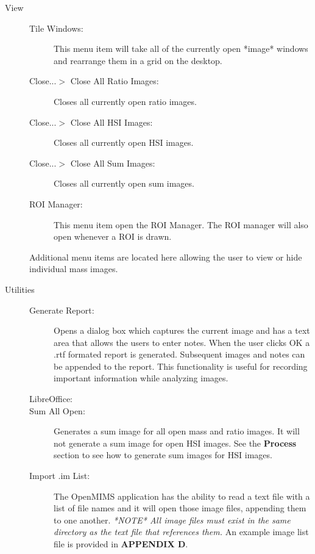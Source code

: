 \documentclass{article}
\begin{document}
\begin{description}
	\item[\large{View}] \indent                       
	\begin{description}
	
	\item[Tile Windows:] This menu item will take all of the currently open *image* windows
	and rearrange them in a grid on the desktop.
	
	
	\item[Close...$>$ Close All Ratio Images:] Closes all currently open ratio images.
	
	\item[Close...$>$ Close All HSI Images:] Closes all currently open HSI images.
	
	\item[Close...$>$ Close All Sum Images:] Closes all currently open sum images.
	
	\item[ROI Manager:] This menu item open the ROI Manager. The ROI manager will also
	open whenever a ROI is drawn.
	
	\end{description}
	
	Additional menu items are located here allowing the user to view or hide individual mass images.
	
	\vspace{5mm}
	\item[\large{Utilities}] \indent                       
	
	\begin{description}
	
	\item[Generate Report:] Opens a dialog box which captures the current image and has a text area that
	allows the users to enter notes. When the user clicks OK a .rtf formated report is generated. Subsequent 
	images and notes can be appended to the report. This functionality is useful for recording important
	information while analyzing images.
	
	\item[LibreOffice:] 
	
	\item[Sum All Open:] Generates a sum image for all open mass and ratio images. It will not generate
	a sum image for open HSI images. See the \textbf{Process} section to see how
	to generate sum images for HSI images. 
	
	\item[Import .im List:] The OpenMIMS application has the ability to read a text file with 
	a list of file names and it will open those image files, appending them to one another. \textit{*NOTE* All
	image files must exist in the same directory as the text file that references them.}
	An example image list file is provided in \textbf{APPENDIX D}.
	

\end{description}
\end{description}
\end{document}
